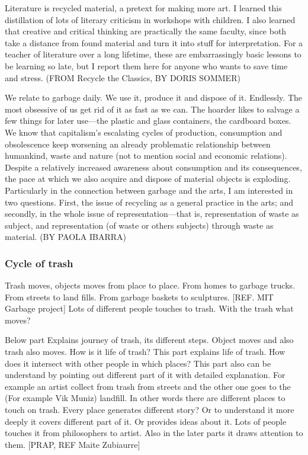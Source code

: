 Literature is recycled material, a pretext for making more art. I learned this distillation of lots of literary criticism in workshops with children. I also learned that creative and critical thinking are practically the same faculty, since both take a distance from found material and turn it into stuff for interpretation. For a teacher of literature over a long lifetime, these are embarrassingly basic lessons to be learning so late, but I report them here for anyone who wants to save time and stress. (FROM Recycle the Classics, BY DORIS SOMMER)

We relate to garbage daily. We use it, produce it and dispose of it. Endlessly. The most obsessive of us get rid of it as fast as we can. The hoarder likes to salvage a few things for later use---the plastic and glass containers, the cardboard boxes. We know that capitalism’s escalating cycles of production, consumption and obsolescence keep worsening an already problematic relationship between humankind, waste and nature (not to mention social and economic relations). Despite a relatively increased awareness about consumption and its consequences, the pace at which we also acquire and dispose of material objects is exploding. Particularly in the connection between
garbage and the arts, I am interested in two questions. First, the issue of recycling as a general practice in the arts; and secondly, in the whole issue of representation---that is, representation of waste as subject, and representation (of waste or others subjects) through waste as material. (BY PAOLA IBARRA)

%
\subsubsection{Cycle of trash}
Trash moves, objects moves from place to place. From homes to garbage trucks. From streets to land fills. From garbage baskets to sculptures. [REF. MIT Garbage project] Lots of different people touches to trash. With the trash what moves?

Below part Explains journey of trash, its different steps. Object moves and also trash also moves. How is it life of trash? This part explains life of trash. How does it intersect with other people in which places? This part also can be understand by pointing out different part of it with detailed explanation. For example an artist collect from trash from streets and the other one goes to the (For example Vik Muniz) landfill. In other words there are different places to touch on trash. Every place generates different story? Or to understand it more deeply it covers different part of it. Or provides ideas about it. Lots of people touches it from philosophers to artist. Also in the later parts it draws attention to them. [PRAP, REF Maite Zubiaurre]


